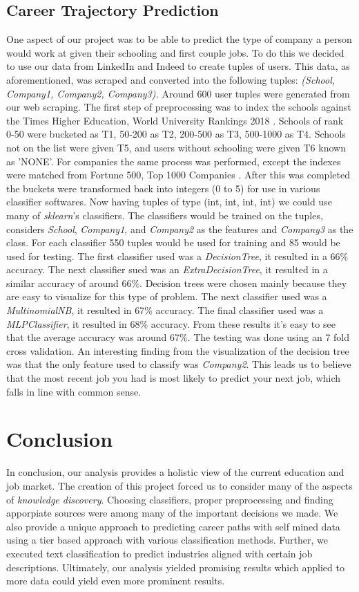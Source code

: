 \subsection{Career Trajectory Prediction}
One aspect of our project was to be able to predict the type of company a person would work at given their schooling and first couple jobs.
To do this we decided to use our data from LinkedIn and Indeed to create tuples of users.
This data, as aforementioned, was scraped and converted into the following tuples: \emph{(School, Company1, Company2, Company3).}
Around 600 user tuples were generated from our web scraping.
The first step of preprocessing was to index the schools against the Times Higher Education, World University Rankings 2018 \cite{timesHigher}. Schools of rank 0-50 were bucketed as T1, 50-200 as T2, 200-500 as T3, 500-1000 as T4. Schools not on the list were given T5, and users without schooling were given T6 known as 'NONE'.
For companies the same process was performed, except the indexes were matched from Fortune 500, Top 1000 Companies \cite{fortune500}.
After this was completed the buckets were transformed back into integers (0 to 5) for use in various classifier softwares. Now having tuples of type (int, int, int, int) we could use many of \emph{sklearn}'s classifiers.
The classifiers would be trained on the tuples, considers \emph{School}, \emph{Company1}, and \emph{Company2} as the features and \emph{Company3} as the class.
For each classifier 550 tuples would be used for training and 85 would be used for testing. 
The first classifier used was a \emph{DecisionTree}, it resulted in a 66\% accuracy. The next classifier sued was an \emph{ExtraDecisionTree}, it resulted in a similar accuracy of around 66\%. Decision trees were chosen mainly because they are easy to visualize for this type of problem. The next classifier used was a \emph{MultinomialNB}, it resulted in 67\% accuracy. The final classifier used was a \emph{MLPClassifier}, it resulted in 68\% accuracy. From these results it's easy to see that the average accuracy was around 67\%. The testing was done using an 7 fold cross validation. An interesting finding from the visualization of the decision tree was that the only feature used to classify was \emph{Company2}. This leads us to believe that the most recent job you had is most likely to predict your next job, which falls in line with common sense.

\section{Conclusion}
In conclusion, our analysis provides a holistic view of the current education and job market. The creation of this project forced us to consider many of the aspects of \emph{knowledge discovery}. Choosing classifiers, proper preprocessing and finding apporpiate sources were among many of the important decisions we made. We also provide a unique approach to predicting career paths with self mined data using a tier based approach with various classification methods. Further, we executed text classification to predict industries aligned with certain job descriptions. Ultimately, our analysis yielded promising results which applied to more data could yield even more prominent results. 

